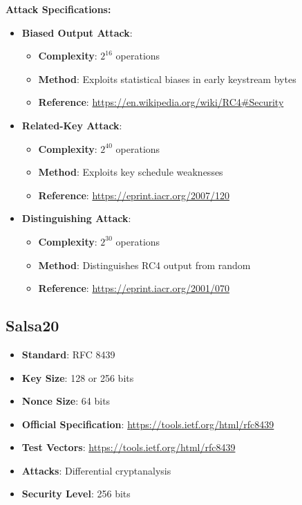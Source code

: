 \documentclass[11pt,a4paper]{article}
\begin{document}
\textbf{Attack Specifications:}
\begin{itemize}
    \item \textbf{Biased Output Attack}: 
    \begin{itemize}
        \item \textbf{Complexity}: $2^{16}$ operations
        \item \textbf{Method}: Exploits statistical biases in early keystream bytes
        \item \textbf{Reference}: \url{https://en.wikipedia.org/wiki/RC4#Security}
    \end{itemize}
    \item \textbf{Related-Key Attack}: 
    \begin{itemize}
        \item \textbf{Complexity}: $2^{40}$ operations
        \item \textbf{Method}: Exploits key schedule weaknesses
        \item \textbf{Reference}: \url{https://eprint.iacr.org/2007/120}
    \end{itemize}
    \item \textbf{Distinguishing Attack}: 
    \begin{itemize}
        \item \textbf{Complexity}: $2^{30}$ operations
        \item \textbf{Method}: Distinguishes RC4 output from random
        \item \textbf{Reference}: \url{https://eprint.iacr.org/2001/070}
    \end{itemize}
\end{itemize}

\subsection{Salsa20}
\begin{itemize}
    \item \textbf{Standard}: RFC 8439
    \item \textbf{Key Size}: 128 or 256 bits
    \item \textbf{Nonce Size}: 64 bits
    \item \textbf{Official Specification}: \url{https://tools.ietf.org/html/rfc8439}
    \item \textbf{Test Vectors}: \url{https://tools.ietf.org/html/rfc8439}
    \item \textbf{Attacks}: Differential cryptanalysis
    \item \textbf{Security Level}: 256 bits
\end{itemize}
\end{document}
